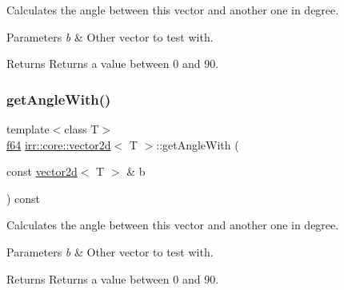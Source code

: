 Calculates the angle between this vector and another one in degree. 


\begin{DoxyParams}{Parameters}
{\em b} & Other vector to test with. \\
\hline
\end{DoxyParams}
\begin{DoxyReturn}{Returns}
Returns a value between 0 and 90. 
\end{DoxyReturn}
\mbox{\label{classirr_1_1core_1_1vector2d_a82714b4037cc4985992647ea69974a60}} 
\subsubsection{\texorpdfstring{get\+Angle\+With()}{getAngleWith()}\hspace{0.1cm}{\footnotesize\ttfamily [2/2]}}
{\footnotesize\ttfamily template$<$class T$>$ \\
\hyperlink{namespaceirr_a1325b02603ad449f92c68fc640af9b28}{f64} \hyperlink{classirr_1_1core_1_1vector2d}{irr\+::core\+::vector2d}$<$ T $>$\+::get\+Angle\+With (\begin{DoxyParamCaption}\item[{const \hyperlink{classirr_1_1core_1_1vector2d}{vector2d}$<$ T $>$ \&}]{b }\end{DoxyParamCaption}) const\hspace{0.3cm}{\ttfamily [inline]}}



Calculates the angle between this vector and another one in degree. 


\begin{DoxyParams}{Parameters}
{\em b} & Other vector to test with. \\
\hline
\end{DoxyParams}
\begin{DoxyReturn}{Returns}
Returns a value between 0 and 90. 
\end{DoxyReturn}
\mbox{\label{classirr_1_1core_1_1vector2d_a351a36a3c2fff525fc17ec15c5d0207f}} 
